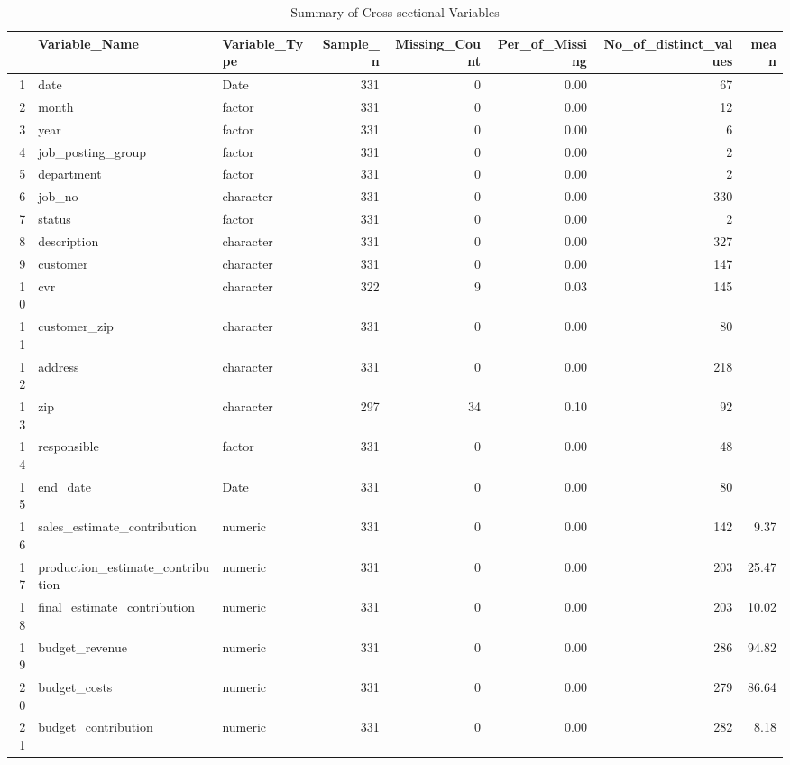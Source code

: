 \begin{sidewaystable}[ht]
\centering
\caption{Summary of Cross-sectional Variables} 
\begin{tabular}{rllrrrrr}
  \hline
 & Variable\_Name & Variable\_Type & Sample\_n & Missing\_Count & Per\_of\_Missing & No\_of\_distinct\_values & mean \\ 
  \hline
1 & date & Date & 331 &   0 & 0.00 &  67 &  \\ 
  2 & month & factor & 331 &   0 & 0.00 &  12 &  \\ 
  3 & year & factor & 331 &   0 & 0.00 &   6 &  \\ 
  4 & job\_posting\_group & factor & 331 &   0 & 0.00 &   2 &  \\ 
  5 & department & factor & 331 &   0 & 0.00 &   2 &  \\ 
  6 & job\_no & character & 331 &   0 & 0.00 & 330 &  \\ 
  7 & status & factor & 331 &   0 & 0.00 &   2 &  \\ 
  8 & description & character & 331 &   0 & 0.00 & 327 &  \\ 
  9 & customer & character & 331 &   0 & 0.00 & 147 &  \\ 
  10 & cvr & character & 322 &   9 & 0.03 & 145 &  \\ 
  11 & customer\_zip & character & 331 &   0 & 0.00 &  80 &  \\ 
  12 & address & character & 331 &   0 & 0.00 & 218 &  \\ 
  13 & zip & character & 297 &  34 & 0.10 &  92 &  \\ 
  14 & responsible & factor & 331 &   0 & 0.00 &  48 &  \\ 
  15 & end\_date & Date & 331 &   0 & 0.00 &  80 &  \\ 
  16 & sales\_estimate\_contribution & numeric & 331 &   0 & 0.00 & 142 & 9.37 \\ 
  17 & production\_estimate\_contribution & numeric & 331 &   0 & 0.00 & 203 & 25.47 \\ 
  18 & final\_estimate\_contribution & numeric & 331 &   0 & 0.00 & 203 & 10.02 \\ 
  19 & budget\_revenue & numeric & 331 &   0 & 0.00 & 286 & 94.82 \\ 
  20 & budget\_costs & numeric & 331 &   0 & 0.00 & 279 & 86.64 \\ 
  21 & budget\_contribution & numeric & 331 &   0 & 0.00 & 282 & 8.18 \\ 

\end{tabular}
\end{sidewaystable}
